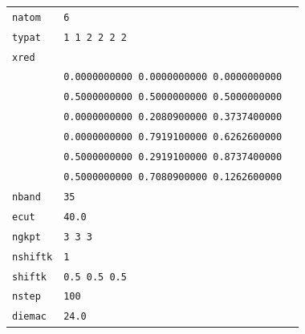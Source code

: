 \documentclass[11pt,a4paper]{article}
\begin{document}
\begin{center}
\begin{tabular}{lll}
\texttt{natom}&\texttt{6}&\\
\texttt{typat}&\texttt{1 1 2 2 2 2}&\\
\texttt{xred} &&\\
&\texttt{0.0000000000    0.0000000000    0.0000000000}&\\
&\texttt{0.5000000000    0.5000000000    0.5000000000}&\\
&\texttt{0.0000000000    0.2080900000    0.3737400000}&\\
&\texttt{0.0000000000    0.7919100000    0.6262600000}&\\
&\texttt{0.5000000000    0.2919100000    0.8737400000}&\\
&\texttt{0.5000000000    0.7080900000    0.1262600000}&\\
\texttt{nband}&\texttt{35}&\\
\texttt{ecut}&\texttt{40.0}&\\
\texttt{ngkpt}&\texttt{3 3 3}&\\
\texttt{nshiftk}&\texttt{1}&\\
\texttt{shiftk}&\texttt{0.5 0.5 0.5}&\\
\texttt{nstep}&\texttt{100}&\\
\texttt{diemac}&\texttt{24.0}&\\
\end{tabular}
\end{center}
\end{document}
